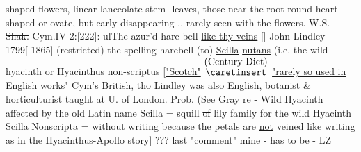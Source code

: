 \documentclass[a4paper]{article}
\begin{document}
{\begin{minipage}[t]{0.8\textwidth}
{\begin{minipage}[t]{0.5\textwidth}
shaped flowers, linear-lanceolate stem-
leaves, those near the root round-heart
shaped or ovate, but early disappearing
.. rarely seen with the flowers.
W.S. \sout{Shak.} Cym.IV 2:[222]: ul{The azur'd hare-bell}
\ul{like thy veins} [] John Lindley 1799[-1865]
(restricted) the spelling harebell
(to) \ul{Scilla} \ul{nutans} (i.e. the wild
hyacinth or Hyacinthus non-scriptus
\ul{
    ["Scotch"} 
\color{blue}
$\stackrel{\hbox{(Century Dict)}}{\hbox{$\caretinsert$}}$
\color{red}
\ul{"rarely so used in English}
works" \ul{Cym's British}, tho Lindley 
was also English, botanist \& horticulturist
taught at U. of London. Prob. (See
Gray re - Wild Hyacinth affected
by the old Latin name Scilla = squill
\sout{of} lily family for the wild Hyacinth
Scilla Nonscripta = without writing
because the petals are \ul{not} veined like
writing as in the Hyacinthus-Apollo story]
\color{blue}
??? last "comment" mine
- has to be - LZ
\end{minipage}
}
\end{minipage}
}
\end{document}

